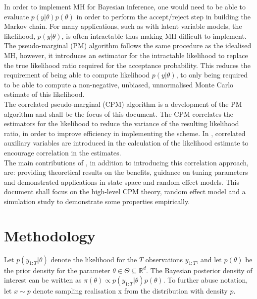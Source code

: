 \documentclass{article}
\begin{document}
In order to implement MH for Bayesian inference, one would need to be able to evaluate $p(y|\theta) p(\theta)$ in order to perform the accept/reject step in building the Markov chain. For many applications, such as with latent variable models, the likelihood, $ p(y | \theta)$, is often intractable thus making MH difficult to implement. \\

The pseudo-marginal (PM) algorithm follows the same procedure as the idealised MH, however, it introduces an estimator for the intractable likelihood to replace the true likelihood ratio required for the acceptance probability. This reduces the requirement of being able to compute likelihood $p(y|\theta)$, to only being required to be able to compute a non-negative, unbiased, unnormalised Monte Carlo estimate of this likelihood. \\

The correlated pseudo-marginal (CPM) algorithm is a development of the PM algorithm and shall be the focus of this document. The CPM correlates the estimators for the likelihood to reduce the variance of the resulting likelihood ratio, in order to improve efficiency in implementing the scheme. In \cite{cpmmDeligiannidis2015}, correlated auxiliary variables are introduced in the calculation of the likelihood estimate to encourage correlation in the estimates.\\

The main contributions of \cite{cpmmDeligiannidis2015}, in addition to introducing this correlation approach, are: providing theoretical results on the benefits, guidance on tuning parameters and demonstrated applications in state space and random effect models. This document shall focus on the high-level CPM theory, random effect model and a simulation study to demonstrate some properties empirically.

\section{Methodology}
Let $p(y_{1:T}|\theta)$ denote the likelihood for the $T$ observations $y_{1:T}$, and let $p(\theta)$ be the prior density for the parameter $\theta \in \Theta \subseteq \mathbb{R}^{d}$. The Bayesian posterior density of interest can be written as $\pi (\theta) \propto p(y_{1:T}|\theta) p(\theta)$. To further abuse notation, let $x \sim p$ denote sampling realisation x from the distribution with density $p$.\\
\end{document}
